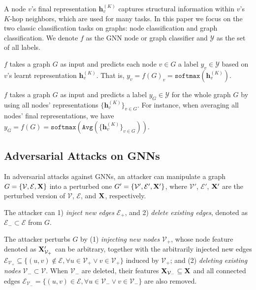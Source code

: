  
A node $v$’s final representation $\bm{h}_v^{(K)}$ captures structural information within $v$’s $K$-hop neighbors, which are used for many tasks. In this paper we focus on the two classic classification tasks on graphs: node classification and graph classification. We  denote $f$ as the GNN node or graph classifier and $\mathcal{Y}$ as the set of all labels.  

\vspace{+0.05in}
  $f$ takes a graph $G$ as input and predicts each node $v \in G$ a label $y_v \in \mathcal{Y}$ based on $v$'s learnt representation $\bm{h}_v^{(K)}$. That is, $y_v = f(G)_v = \texttt{softmax}(\bm{h}_v^{(K)})$. 

\vspace{+0.05in}
  $f$ takes a graph $G$ as input and predicts a label $y_G \in \mathcal{Y}$ for the whole graph $G$ by using all nodes' representations $\{\bm{h}_v^{(K)}\}_{v\in G}$. For instance, when averaging all nodes' final representations, we have $y_G = f(G) = \texttt{softmax}(\texttt{Avg}(\{\bm{h}_v^{(K)}\}_{v \in G}))$. 




\subsection{Adversarial Attacks on GNNs} 


In adversarial attacks against GNNs, an attacker can manipulate a graph $G=\{\mathcal{V},\mathcal{E},{\bf X}\}$ into a perturbed one $G' = \{\mathcal{V}',\mathcal{E}',{\bf X}'\}$, where $\mathcal{V}'$, $\mathcal{E}'$, ${\bf X}'$ are the perturbed version of $\mathcal{V}$, $\mathcal{E}$, and ${\bf X}$, respectively. 

\vspace{+0.05in}
 The attacker can 1) \emph{inject new edges} $\mathcal{E}_+$, and 2) \emph{delete existing edges}, denoted as $\mathcal{E}_{-}\subset \mathcal{E}$ from $G$. 



\vspace{+0.05in}
The attacker perturbs $G$ by (1) \emph{injecting new nodes} $\mathcal{V}_+$,  whose node feature denoted as ${\bf X}'_{\mathcal{V}_+}$ can be arbitrary, together with the arbitrarily injected new edges $\mathcal{E}_{\mathcal{V}_+} \subseteq \{(u,v) \notin \mathcal{E}, \forall u \in \mathcal{V}_+ \vee v \in \mathcal{V}_+ \}$ induced by 
$\mathcal{V}_+$; and (2) \emph{deleting existing nodes} $\mathcal{V}_- \subset \mathcal{V}$. When $\mathcal{V}_-$ are deleted, their features  ${\bf X}_{\mathcal{V}_-} \subseteq {\bf X}$ and all connected edges  $\mathcal{E}_{\mathcal{V}_-} = \{(u,v) \in \mathcal{E}, \forall u \in \mathcal{V}_- \vee v \in \mathcal{V}_- \}$ are also removed. 


